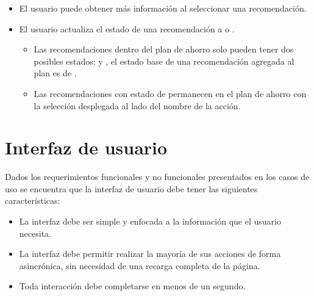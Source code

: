 \begin{usecase}
{\begin{itemize}
      \begin{itemize}
      \item El sistema debe indicar que la lista de recomendaciones es el plan
        de ahorro.
      \item El usuario puede agregar más recomendaciones desde la lista de
        recomendaciones, cuando se añade una de estas solamente es
        visible en el plan de ahorro ya no debe de aparecer en la lista de
        recomendaciones
      \item El usuario puede remover recomendaciones de su plan seleccionando
         en un menú desplegable al lado del nombre de la
        acción.
      \end{itemize}
    \item El usuario puede obtener más información al seleccionar una recomendación.
    \item El usuario actualiza el estado de una recomendación a
       o .
      \begin{itemize}
      \item Las recomendaciones dentro del plan de ahorro solo pueden tener
        dos posibles estados:  y ,
        el estado base de una recomendación agregada al plan es de
        .
      \item Las recomendaciones con estado de  permanecen
        en el plan de ahorro con la selección  desplegada
        al lado del nombre de la acción.
      \end{itemize}
    \end{itemize}
  }
\end{usecase}

\section{Interfaz de usuario}

Dados los requerimientos funcionales y no funcionales presentados en los
casos de uso se encuentra que la interfaz de usuario debe tener las
siguientes características:

\begin{itemize}
\item La interfaz debe ser simple y enfocada a la información que el
  usuario necesita.
\item La interfaz debe permitir realizar la mayoría de sus
  acciones de forma asincrónica, sin necesidad de una recarga completa de
  la página.
\item Toda interacción debe completarse en menos de un segundo.
\end{itemize}

